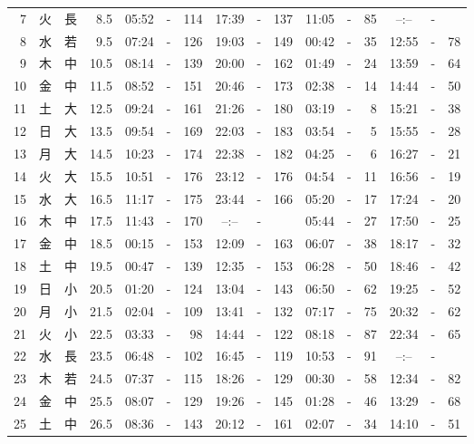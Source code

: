 \documentclass[12pt.a4j]{jsarticle}
\begin{document}
\begin{center}
\begin{table}[ht]
\begin{tabular}{|rc|cr|ccrccr|ccrccr|}
 7 & 火 & 長 &  8.5 &  05:52 &-& 114  &  17:39 &-& 137  &   11:05 &-&  85  &   --:-- &-&     \\
 8 & 水 & 若 &  9.5 &  07:24 &-& 126  &  19:03 &-& 149  &   00:42 &-&  35  &   12:55 &-&  78  \\
 9 & 木 & 中 & 10.5 &  08:14 &-& 139  &  20:00 &-& 162  &   01:49 &-&  24  &   13:59 &-&  64  \\
10 & 金 & 中 & 11.5 &  08:52 &-& 151  &  20:46 &-& 173  &   02:38 &-&  14  &   14:44 &-&  50  \\
11 & 土 & 大 & 12.5 &  09:24 &-& 161  &  21:26 &-& 180  &   03:19 &-&   8  &   15:21 &-&  38  \\
12 & 日 & 大 & 13.5 &  09:54 &-& 169  &  22:03 &-& 183  &   03:54 &-&   5  &   15:55 &-&  28  \\
13 & 月 & 大 & 14.5 &  10:23 &-& 174  &  22:38 &-& 182  &   04:25 &-&   6  &   16:27 &-&  21  \\
14 & 火 & 大 & 15.5 &  10:51 &-& 176  &  23:12 &-& 176  &   04:54 &-&  11  &   16:56 &-&  19  \\
15 & 水 & 大 & 16.5 &  11:17 &-& 175  &  23:44 &-& 166  &   05:20 &-&  17  &   17:24 &-&  20  \\
16 & 木 & 中 & 17.5 &  11:43 &-& 170  &  --:-- &-&     &   05:44 &-&  27  &   17:50 &-&  25  \\
17 & 金 & 中 & 18.5 &  00:15 &-& 153  &  12:09 &-& 163  &   06:07 &-&  38  &   18:17 &-&  32  \\
18 & 土 & 中 & 19.5 &  00:47 &-& 139  &  12:35 &-& 153  &   06:28 &-&  50  &   18:46 &-&  42  \\
19 & 日 & 小 & 20.5 &  01:20 &-& 124  &  13:04 &-& 143  &   06:50 &-&  62  &   19:25 &-&  52  \\
20 & 月 & 小 & 21.5 &  02:04 &-& 109  &  13:41 &-& 132  &   07:17 &-&  75  &   20:32 &-&  62  \\
21 & 火 & 小 & 22.5 &  03:33 &-&  98  &  14:44 &-& 122  &   08:18 &-&  87  &   22:34 &-&  65  \\
22 & 水 & 長 & 23.5 &  06:48 &-& 102  &  16:45 &-& 119  &   10:53 &-&  91  &   --:-- &-&     \\
23 & 木 & 若 & 24.5 &  07:37 &-& 115  &  18:26 &-& 129  &   00:30 &-&  58  &   12:34 &-&  82  \\
24 & 金 & 中 & 25.5 &  08:07 &-& 129  &  19:26 &-& 145  &   01:28 &-&  46  &   13:29 &-&  68  \\
25 & 土 & 中 & 26.5 &  08:36 &-& 143  &  20:12 &-& 161  &   02:07 &-&  34  &   14:10 &-&  51  \\

\end{tabular}
\end{table}
\end{center}
\end{document}
